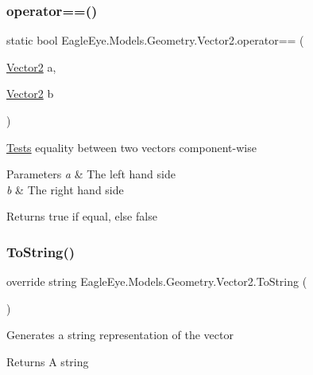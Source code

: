 \subsubsection{\texorpdfstring{operator==()}{operator==()}}
{\footnotesize\ttfamily static bool Eagle\+Eye.\+Models.\+Geometry.\+Vector2.\+operator== (\begin{DoxyParamCaption}\item[{\mbox{\hyperlink{struct_eagle_eye_1_1_models_1_1_geometry_1_1_vector2}{Vector2}}}]{a,  }\item[{\mbox{\hyperlink{struct_eagle_eye_1_1_models_1_1_geometry_1_1_vector2}{Vector2}}}]{b }\end{DoxyParamCaption})\hspace{0.3cm}{\ttfamily [static]}}



\mbox{\hyperlink{namespace_eagle_eye_1_1_tests}{Tests}} equality between two vectors component-\/wise 


\begin{DoxyParams}{Parameters}
{\em a} & The left hand side\\
\hline
{\em b} & The right hand side\\
\hline
\end{DoxyParams}
\begin{DoxyReturn}{Returns}
true if equal, else false
\end{DoxyReturn}
\mbox{\label{struct_eagle_eye_1_1_models_1_1_geometry_1_1_vector2_ad6c5d2e69555886b7f9bbd56f814a908}} 
\subsubsection{\texorpdfstring{ToString()}{ToString()}}
{\footnotesize\ttfamily override string Eagle\+Eye.\+Models.\+Geometry.\+Vector2.\+To\+String (\begin{DoxyParamCaption}{ }\end{DoxyParamCaption})}



Generates a string representation of the vector 

\begin{DoxyReturn}{Returns}
A string
\end{DoxyReturn}


